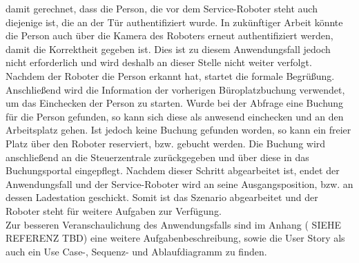     damit gerechnet, dass die Person, die vor dem Service-Roboter steht auch diejenige ist, die an der Tür authentifiziert 
    wurde. In zukünftiger Arbeit könnte die Person auch über die Kamera des Roboters erneut authentifiziert werden, damit die 
    Korrektheit gegeben ist. Dies ist zu diesem Anwendungsfall jedoch nicht erforderlich und wird deshalb an dieser Stelle 
    nicht weiter verfolgt. 
    \\
    Nachdem der Roboter die Person erkannt hat, startet die formale Begrüßung. Anschließend wird die Information der 
    vorherigen Büroplatzbuchung verwendet, um das Einchecken der Person zu starten. Wurde bei der Abfrage eine Buchung für 
    die Person gefunden, so kann sich diese als anwesend einchecken und an den Arbeitsplatz gehen. Ist jedoch keine 
    Buchung gefunden worden, so kann ein freier Platz über den Roboter reserviert, bzw. gebucht werden. Die Buchung wird 
    anschließend an die Steuerzentrale zurückgegeben und über diese in das Buchungsportal eingepflegt. Nachdem dieser 
    Schritt abgearbeitet ist, endet der Anwendungsfall und der Service-Roboter wird an seine Ausgangsposition, bzw. an dessen 
    Ladestation geschickt. Somit ist das Szenario abgearbeitet und der Roboter steht für weitere Aufgaben zur Verfügung. 
    \\
    \linebreak
    Zur besseren Veranschaulichung des Anwendungsfalls sind im Anhang (%
    SIEHE REFERENZ TBD) eine weitere Aufgabenbeschreibung, sowie die User Story als auch ein Use Case-, 
    Sequenz- und Ablaufdiagramm zu finden.

